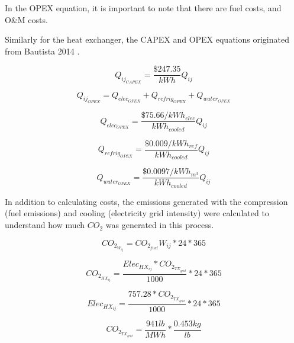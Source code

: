 \documentclass[balance,upint,subscriptcorrection,varvw,mathalfa=cal=boondoxo,spanish,french,vietnamese,russian,greek,pdf-a,colorlinks]{asmeconf}
\begin{document}
In the OPEX equation, it is important to note that there are fuel costs, and O\&M costs. 

Similarly for the heat exchanger, the CAPEX and OPEX equations originated from Bautista 2014 \cite{bautista}. 

\begin{equation}
    Q_{ij_{CAPEX}} = \frac{\$247.35}{kWh}Q_{ij}
\end{equation}

\begin{equation}
    Q_{ij_{OPEX}} = Q_{{elec}_{OPEX}} + Q_{{refrig}_{OPEX}} + Q_{{water}_{OPEX}}
\end{equation}

\begin{equation}
    Q_{{elec}_{OPEX}} = \frac{\$75.66/kWh_{elec}}{kWh_{cooled}}Q_{ij}
\end{equation}

\begin{equation}
    Q_{{refrig}_{OPEX}} = \frac{\$0.009/kWh_{ref}}{kWh_{cooled}}Q_{ij}
\end{equation}

\begin{equation}
    Q_{{water}_{OPEX}} = \frac{\$0.0097/kWh_{m^3}}{kWh_{cooled}}Q_{ij}
\end{equation}

In addition to calculating costs, the emissions generated with the compression (fuel emissions) and cooling (electricity grid intensity) were calculated to understand how much \begin{math}{CO_2} \end{math} was generated in this process.

\begin{equation}
    CO_{2_{W_{ij}}} = CO_{2_{fuel}}W_{ij}*24*365
\end{equation}

\begin{equation}
    CO_{2_{HX_{ij}}} = \frac{Elec_{HX_{ij}}*CO_{2_{TX_{grid}}}}{1000}*24*365
\end{equation}

\begin{equation}
    Elec_{HX_{ij}} = \frac{757.28*CO_{2_{TX_{grid}}}}{1000}*24*365
\end{equation}

\begin{equation}
    CO_{2_{TX_{grid}}} = \frac{941 lb}{MWh}*\frac{0.453 kg}{lb}
\end{equation}
\end{document}
